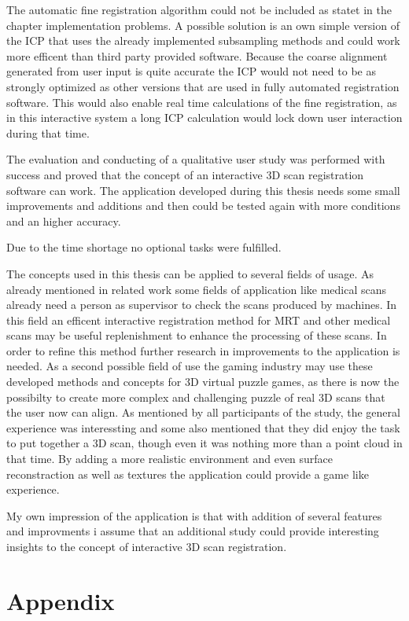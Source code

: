 \documentclass[hyperref,english,bachelorofscience,bibnum,twoside]{cgvpub}
\begin{document}
The automatic fine registration algorithm could not be included as statet in the chapter implementation problems. A possible solution is an own simple version of the ICP that uses the already implemented subsampling methods and could work more efficent than third party provided software. Because the coarse alignment generated from user input is quite accurate the ICP would not need to be as strongly optimized as other versions that are used in fully automated registration software. This would also enable real time calculations of the fine registration, as in this interactive system a long ICP calculation would lock down user interaction during that time.

The evaluation and conducting of a qualitative user study was performed with success and proved that the concept of an interactive 3D scan registration software can work. The application developed during this thesis needs some small improvements and additions and then could be tested again with more conditions and an higher accuracy.

Due to the time shortage no optional tasks were fulfilled.

The concepts used in this thesis can be applied to several fields of usage. As already mentioned in related work some fields of application like medical scans already need a person as supervisor to check the scans produced by machines. In this field an efficent interactive registration method for MRT and other medical scans may be useful replenishment to enhance the processing of these scans. In order to refine this method further research in improvements to the application is needed.
As a second possible field of use the gaming industry may use these developed methods and concepts for 3D virtual puzzle games, as there is now the possibilty to create more complex and challenging puzzle of real 3D scans that the user now can align. As mentioned by all participants of the study, the general experience was interessting and some also mentioned that they did enjoy the task to put together a 3D scan, though even it was nothing more than a point cloud in that time. By adding a more realistic environment and even surface reconstraction as well as textures the application could provide a game like experience.

My own impression of the application is that with addition of several features and improvments i assume that an additional study could provide interesting insights to the concept of interactive 3D scan registration.

\chapter{Appendix}
\end{document}
